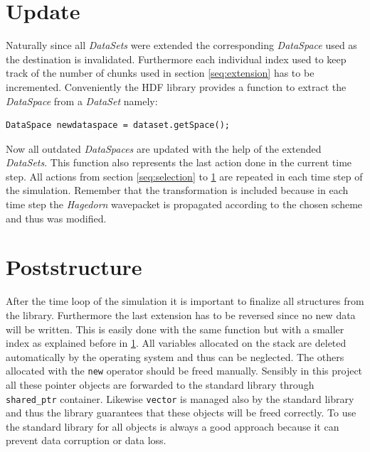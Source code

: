 \section{Update}
\label{seq:update}
Naturally since all \textit{DataSets} were extended the corresponding \textit{DataSpace} used as the destination is invalidated. Furthermore each individual index used to keep track of the number of chunks used in section \ref{seq:extension} has to be incremented. Conveniently the HDF library provides a function to extract the \textit{DataSpace} from a \textit{DataSet} namely:
\begin{lstlisting}
DataSpace newdataspace = dataset.getSpace();
\end{lstlisting}
Now all outdated \textit{DataSpaces} are updated with the help of the extended \textit{DataSets}. This function also represents the last action done in the current time step. All actions from section \ref{seq:selection} to \ref{seq:update} are repeated in each time step of the simulation. Remember that the transformation is included because in each time step the \textit{Hagedorn} wavepacket is propagated according to the chosen scheme and thus was modified.

\section{Poststructure}
\label{seq:poststructure}
After the time loop of the simulation it is important to finalize all structures from the library. Furthermore the last extension has to be reversed since no new data will be written. This is easily done with the same function but with a smaller index as explained before in \ref{seq:update}. All variables allocated on the stack are deleted automatically by the operating system and thus can be neglected. The others allocated with the \texttt{new} operator should be freed manually. Sensibly in this project all these pointer objects are forwarded to the standard library through \texttt{shared\_ptr} container. Likewise \texttt{vector} is managed also by the standard library and thus the library guarantees that these objects will be freed correctly. To use the standard library for all objects is always a good approach because it can prevent data corruption or data loss.

